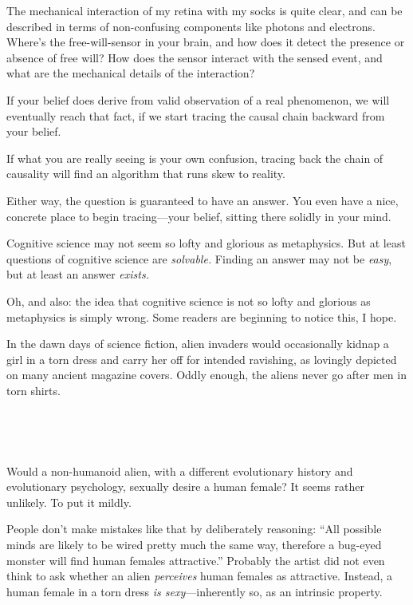 {
 The mechanical interaction of my retina with my socks is quite
clear, and can be described in terms of non-confusing components like
photons and electrons. Where's the free-will-sensor in
your brain, and how does it detect the presence or absence of free
will? How does the sensor interact with the sensed event, and what are
the mechanical details of the interaction?}

{
 If your belief does derive from valid observation of a real
phenomenon, we will eventually reach that fact, if we start tracing the
causal chain backward from your belief.}

{
 If what you are really seeing is your own confusion, tracing back
the chain of causality will find an algorithm that runs skew to
reality.}

{
 Either way, the question is guaranteed to have an answer. You even
have a nice, concrete place to begin tracing---your belief, sitting
there solidly in your mind.}

{
 Cognitive science may not seem so lofty and glorious as
metaphysics. But at least questions of cognitive science are
\textit{solvable.} Finding an answer may not be \textit{easy}, but at
least an answer \textit{exists.}}

{
 Oh, and also: the idea that cognitive science is not so lofty and
glorious as metaphysics is simply wrong. Some readers are beginning to
notice this, I hope.}

\myendsectiontext


{
 In the dawn days of science fiction, alien invaders would
occasionally kidnap a girl in a torn dress and carry her off for
intended ravishing, as lovingly depicted on many ancient magazine
covers. Oddly enough, the aliens never go after men in torn shirts.}

{
 ~}

{\centering
{}
 
\par}


\bigskip

{
 ~}

{
 Would a non-humanoid alien, with a different evolutionary history
and evolutionary psychology, sexually desire a human female? It seems
rather unlikely. To put it mildly.}

{
 People don't make mistakes like that by
deliberately reasoning: ``All possible minds are
likely to be wired pretty much the same way, therefore a bug-eyed
monster will find human females attractive.''
Probably the artist did not even think to ask whether an alien
\textit{perceives} human females as attractive. Instead, a human female
in a torn dress \textit{is sexy}{}---inherently so, as an intrinsic
property.}

